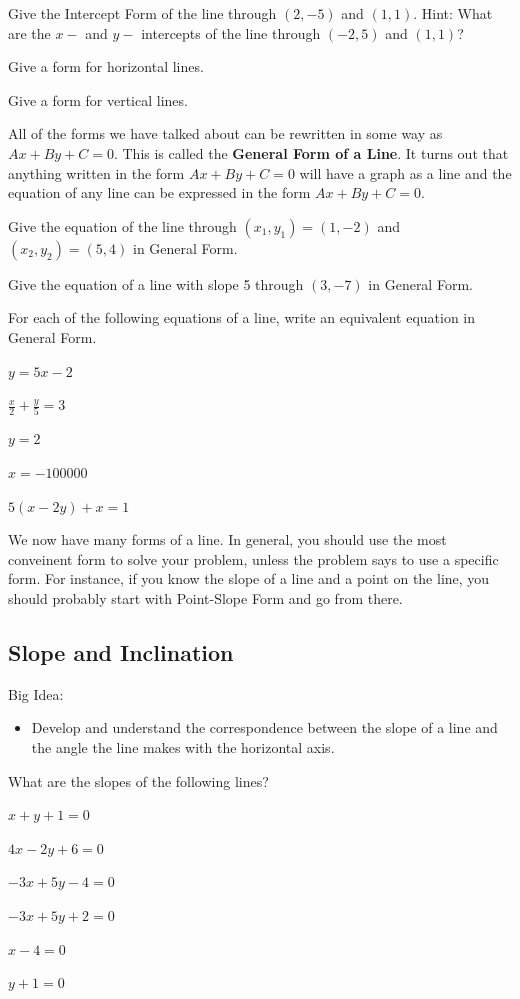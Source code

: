 \bq Give the Intercept Form of the line through $(2,-5)$ and $(1,1)$. Hint: What are the $x-$ and $y-$ intercepts of the line through $(-2,5)$ and $(1,1)$?
\eq

\bq Give a form for horizontal lines.
\eq

\bq\label{q15} Give a form for vertical lines.
\eq

\begin{info} All of the forms we have talked about can be rewritten in some way as $ Ax+By+C=0$. This is called the \textbf{General Form of a Line}. It turns out that anything written in the form $ Ax+By+C=0$ will have a graph as a line and the equation of any line can be expressed in the form $ Ax+By+C=0$.  \end{info}

\question Give the equation of the line through $(x_1,y_1)=(1,-2)$ and $(x_2,y_2) = (5,4)$ in General Form.

\question Give the equation of a line with slope 5 through $(3,-7)$ in General Form.

\bq For each of the following equations of a line, write an equivalent equation in General Form.
\be
\item $y=5x-2$
\item $ \frac{x}{2}+\frac{y}{5}=3$
\item $y=2$
\item $x=-100000$
\item $5(x-2y)+x=1$
\ee
\eq

We now have many forms of a line. In general, you should use the most conveinent form to solve your problem, unless the problem says to use a specific form. For instance, if you know the slope of a line and a point on the line, you should probably start with Point-Slope Form and go from there.
\subsection{Slope and Inclination}
Big Idea:
\begin{itemize}
\item Develop and understand the correspondence between the slope of a line and the angle the line makes with the horizontal axis.
\end{itemize}
\bq What are the slopes of the following lines?
\be
\item $x+y+1=0$
\item $4x-2y+6=0$
\item $-3x+5y-4=0$
\item $-3x+5y+2=0$
\item $x-4=0$
\item $y+1=0$
\ee
\eq


